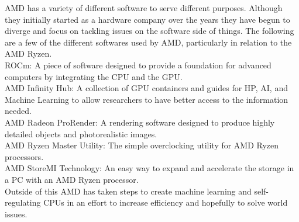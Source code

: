 \documentclass[../computer-history.tex]{subfiles}
\begin{document}
AMD has a variety of different software to serve different purposes. Although they initially started as a hardware company over the years they have begun to diverge and focus on tackling issues on the software side of things. The following are a few of the different softwares used by AMD, particularly in relation to the AMD Ryzen.
\\ROCm: A piece of software designed to provide a foundation for advanced computers by integrating the CPU and the GPU.
\\AMD Infinity Hub: A collection of GPU containers and guides for HP, AI, and Machine Learning to allow researchers to have better access to the information needed.
\\AMD Radeon ProRender: A rendering software designed to produce highly detailed objects and photorealistic images.
\\AMD Ryzen Master Utility: The simple overclocking utility for AMD Ryzen processors.
\\AMD StoreMI Technology: An easy way to expand and accelerate the storage in a PC with an AMD Ryzen processor.
\\Outside of this AMD has taken steps to create machine learning and self-regulating CPUs in an effort to increase efficiency and hopefully to solve world issues.

\biblio
\end{document}
